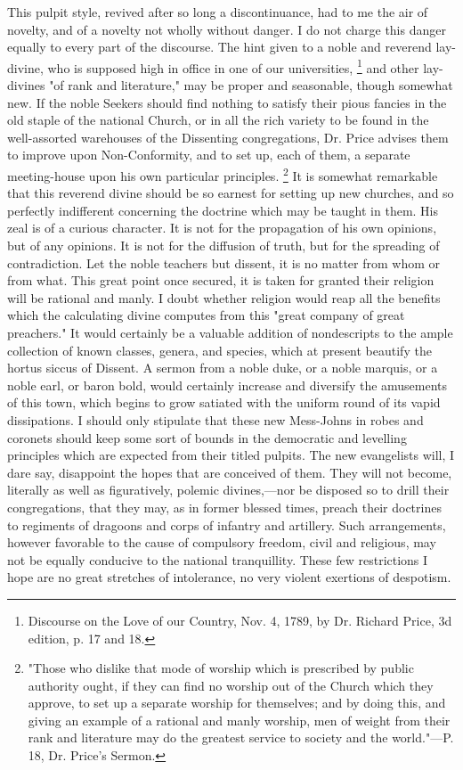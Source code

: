 This pulpit style, revived after so long a discontinuance, had to me the air of novelty, and of a novelty not wholly without danger. I do not charge this danger equally to every part of the discourse. The hint given to a noble and reverend lay-divine, who is supposed high in office in one of our universities,
\footnote{ Discourse on the Love of our Country, Nov. 4, 1789, by Dr. Richard Price, 3d edition, p. 17 and 18.}
 and other lay-divines "of rank and literature," may be proper and seasonable, though somewhat new. If the noble Seekers should find nothing to satisfy their pious fancies in the old staple of the national Church, or in all the rich variety to be found in the well-assorted warehouses of the Dissenting congregations, Dr. Price advises them to improve upon Non-Conformity, and to set up, each of them, a separate meeting-house upon his own particular principles.
\footnote{ "Those who dislike that mode of worship which is prescribed by public authority ought, if they can find no worship out of the Church which they approve, to set up a separate worship for themselves; and by doing this, and giving an example of a rational and manly worship, men of weight from their rank and literature may do the greatest service to society and the world."—P. 18, Dr. Price's Sermon.}
 It is somewhat remarkable that this reverend divine should be so earnest for setting up new churches, and so perfectly indifferent concerning the doctrine which may be taught in them. His zeal is of a curious character. It is not for the propagation of his own opinions, but of any opinions. It is not for the diffusion of truth, but for the spreading of contradiction. Let the noble teachers but dissent, it is no matter from whom or from what. This great point once secured, it is taken for granted their religion will be rational and manly. I doubt whether religion would reap all the benefits which the calculating divine computes from this "great company of great preachers." It would certainly be a valuable addition of nondescripts to the ample collection of known classes, genera, and species, which at present beautify the hortus siccus of Dissent. A sermon from a noble duke, or a noble marquis, or a noble earl, or baron bold, would certainly increase and diversify the amusements of this town, which begins to grow satiated with the uniform round of its vapid dissipations. I should only stipulate that these new Mess-Johns in robes and coronets should keep some sort of bounds in the democratic and levelling principles which are expected from their titled pulpits. The new evangelists will, I dare say, disappoint the hopes that are conceived of them. They will not become, literally as well as figuratively, polemic divines,—nor be disposed so to drill their congregations, that they may, as in former blessed times, preach their doctrines to regiments of dragoons and corps of infantry and artillery. Such arrangements, however favorable to the cause of compulsory freedom, civil and religious, may not be equally conducive to the national tranquillity. These few restrictions I hope are no great stretches of intolerance, no very violent exertions of despotism.

